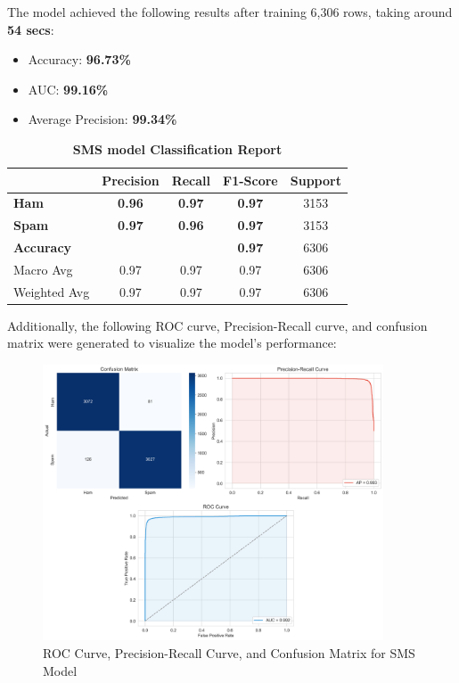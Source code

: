 \documentclass{article}
\begin{document}
\noindent
The model achieved the following results after training 6,306 rows, taking around \textbf{54 secs}:

\begin{itemize}
    \item Accuracy: \textbf{96.73\%}
    \item AUC: \textbf{99.16\%}
    \item Average Precision: \textbf{99.34\%}
\end{itemize}

\begin{table}[htbp]
    \centering
    \caption{\textbf{SMS model Classification Report}}
    \begin{tabular}{l c c c c}
    \toprule
     & \textbf{Precision} & \textbf{Recall} & \textbf{F1-Score} & Support \\
    \midrule
    \textbf{Ham} & \textbf{0.96} & \textbf{0.97} & \textbf{0.97} & 3153 \\
    \textbf{Spam} & \textbf{0.97} & \textbf{0.96} & \textbf{0.97} & 3153 \\
    \midrule
    \textbf{Accuracy} & & & \textbf{0.97} & 6306 \\
    Macro Avg & 0.97 & 0.97 & 0.97 & 6306 \\
    Weighted Avg & 0.97 & 0.97 & 0.97 & 6306 \\
    \bottomrule
    \end{tabular}
    \label{tab:classification_report_2}
\end{table}

\noindent
Additionally, the following ROC curve, Precision-Recall curve, and confusion matrix were generated to visualize the model's performance:

\begin{figure}[htbp]
    \centering
    \includegraphics[width=0.9\textwidth]{../analysis/sms/randomforest/combined_metrics.png}
    \caption{ROC Curve, Precision-Recall Curve, and Confusion Matrix for SMS Model} 
    \label{fig:combined_metrics_2}
\end{figure}
\end{document}
